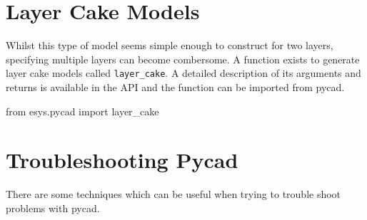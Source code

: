 \section{Layer Cake Models}
Whilst this type of model seems simple enough to construct for two layers,
specifying multiple layers can become combersome. A function exists to generate
layer cake models called \verb!layer_cake!. A detailed description of its
arguments and returns is available in the API and the function can be imported
from pycad.
\begin{python}
from esys.pycad import layer_cake
\end{python}

\section{Troubleshooting Pycad}
There are some techniques which can be useful when trying to trouble shoot
problems with pycad.
